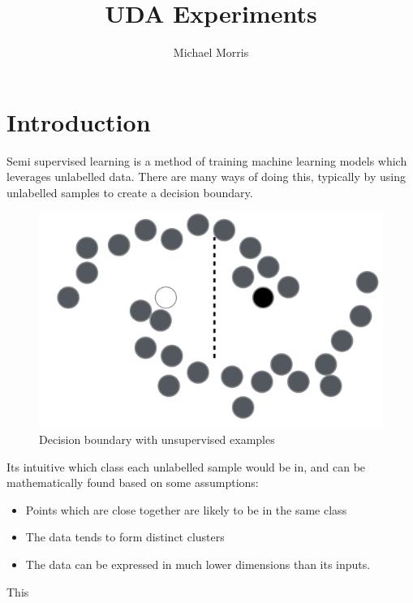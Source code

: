 \documentclass{article}
\title{UDA Experiments}
\author{Michael Morris}
\begin{document}
\maketitle

\section{Introduction}
Semi supervised learning is a method of training machine learning models which leverages unlabelled data. There are many ways of doing this, typically by using unlabelled samples to create a decision boundary.

\begin{figure}[h]
  \begin{center}
    \includegraphics[width=.4\textwidth]{SSL}
    \caption{Decision boundary with unsupervised examples}
  \end{center}
\end{figure}

Its intuitive which class each unlabelled sample would be in, and can be mathematically found based on some assumptions:
\begin{itemize}
  \item Points which are close together are likely to be in the same class 
  \item The data tends to form distinct clusters
  \item The data can be expressed in much lower dimensions than its inputs.
\end{itemize}
This 
\end{document}
